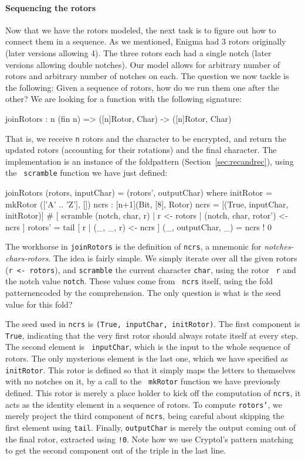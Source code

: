 \paragraph*{Sequencing the rotors} Now that we have the rotors modeled,
the next task is to figure out how to connect them in a sequence. As
we mentioned, Enigma had 3 rotors originally (later versions allowing
4). The three rotors each had a single notch (later versions allowing
double notches).  Our model allows for arbitrary number of rotors and
arbitrary number of notches on each.  The question we now tackle is
the following: Given a sequence of rotors, how do we run them one
after the other? We are looking for a function with the following
signature:
\begin{code}
  joinRotors : {n} (fin n) => ([n]Rotor, Char) -> ([n]Rotor, Char)
\end{code}
That is, we receive {\tt n} rotors and the character to be encrypted,
and return the updated rotors (accounting for their rotations) and the
final character.  The implementation is an instance of the
fold\indFold pattern (Section~\ref{sec:recandrec}), using the {\tt
  scramble} function we have just defined:
\begin{code}
  joinRotors (rotors, inputChar) = (rotors', outputChar)
    where 
      initRotor = mkRotor (['A' .. 'Z'], [])
      ncrs : [n+1](Bit, [8], Rotor)
      ncrs = [(True, inputChar, initRotor)]
                # [  scramble (notch, char, r)
                     | r <- rotors
                     | (notch, char, rotor') <- ncrs
                  ]
      rotors' = tail [ r | (_, _, r) <- ncrs ]
      (_, outputChar, _) = ncrs ! 0
\end{code}
The workhorse in {\tt joinRotors} is the definition of {\tt ncrs}, a
mnemonic for {\em notches-chars-rotors}. The idea is fairly simple.
We simply iterate over all the given rotors ({\tt r <- rotors}), and
{\tt scramble} the current character {\tt char}, using the rotor {\tt
  r} and the notch value {\tt notch}.  These values come from {\tt
  ncrs} itself, using the fold pattern\indFold encoded by the
comprehension\indComp.  The only question is what is the seed value
for this fold? 

The seed used in {\tt ncrs} is {\tt (True, inputChar, initRotor)}. The
first component is {\tt True}, indicating that the very first rotor
should always rotate itself at every step. The second element is {\tt
  inputChar}, which is the input to the whole sequence of rotors. The
only mysterious element is the last one, which we have specified as
{\tt initRotor}.  This rotor is defined so that it simply maps the
letters to themselves with no notches on it, by a call to the {\tt
  mkRotor} function we have previously defined. This rotor is merely a
place holder to kick off the computation of {\tt ncrs}, it acts as the
identity element in a sequence of rotors.  To compute {\tt rotors'},
we merely project the third component of {\tt ncrs}, being careful
about skipping the first element using {\tt tail}\indTail.  Finally,
{\tt outputChar} is merely the output coming out of the final rotor,
extracted using {\tt !0}\indRIndex. Note how we use Cryptol's pattern
matching to get the second component out of the triple in the last
line.\indPatMatch

